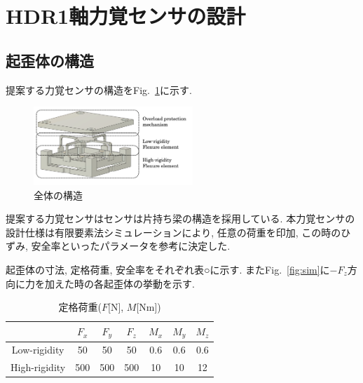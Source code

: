 \section{HDR1軸力覚センサの設計}
\subsection{起歪体の構造}
提案する力覚センサの構造をFig.~\ref{fig:sensor}に示す. 

\begin{figure}[b]
  \begin{center}
    \includegraphics[width=6.0cm]{pic/sensor.png}
    \caption{全体の構造}\label{fig:sensor}
  \end{center}
\end{figure}

提案する力覚センサはセンサは片持ち梁の構造を採用している. 
本力覚センサの設計仕様は有限要素法シミュレーションにより, 
任意の荷重を印加, この時のひずみ, 安全率といったパラメータを参考に決定した.

起歪体の寸法, 定格荷重, 安全率をそれぞれ表○に示す. 
またFig.~\ref{fig:sim}に$-F_z$方向に力を加えた時の各起歪体の挙動を示す.
\begin{table}[h]
  \caption{定格荷重($F$[N], $M$[Nm])}\label{tb:kajuu}
  \begin{center}
   \begin{tabular}{ c c c c c c c }
    \hline
     & $F_x$ & $F_y$ & $F_z$ & $M_x$ & $M_y$ & $M_z$  \\
    \hline
    Low-rigidity & 50 & 50 & 50 & 0.6 & 0.6 & 0.6  \\
    \hline
    High-rigidity & 500 & 500 & 500 & 10 & 10 & 12  \\
    \hline   
   \end{tabular}
  \end{center}
 \end{table}

